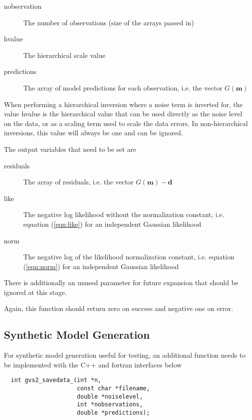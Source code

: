\documentclass{article}
\begin{document}
\begin{description}
\item[nobservation] The number of observations (size of the arrays passed in)
\item[hvalue] The hierarchical scale value
\item[predictions] The array of model predictions for each observation, i.e. the vector $G(\mathbf{m})$
\end{description}

When performing a hierarchical inversion where a noise term is
inverted for, the value hvalue is the hierarchical value that can be
used directly as the noise level on the data, or as a scaling term
used to scale the data errors. In non-hierarchical inversions, this value
will always be one and can be ignored.

The output variables that need to be set are

\begin{description}
\item[residuals] The array of residuals, i.e. the vector $G(\mathbf{m}) - \mathbf{d}$
\item[like] The negative log likelihood without the normalization constant, i.e. equation (\ref{eqn:like})
  for an independent Gaussian likelihood
\item[norm] The negative log of the likelihood normalization constant, i.e. equation (\ref{eqn:norm})
  for an independent Gaussian likelihood
\end{description}

There is additionally an unused parameter for future expansion that should be ignored
at this stage.

Again, this function should return zero on success and negative one on error.

\subsection{Synthetic Model Generation}

For synthetic model generation useful for testing, an additional function needs to be
implemented with the C++ and fortran interfaces below

\begin{verbatim}
  int gvs2_savedata_(int *n,
                     const char *filename,
                     double *noiselevel,
                     int *nobservations,
                     double *predictions);
\end{verbatim}
\end{document}
